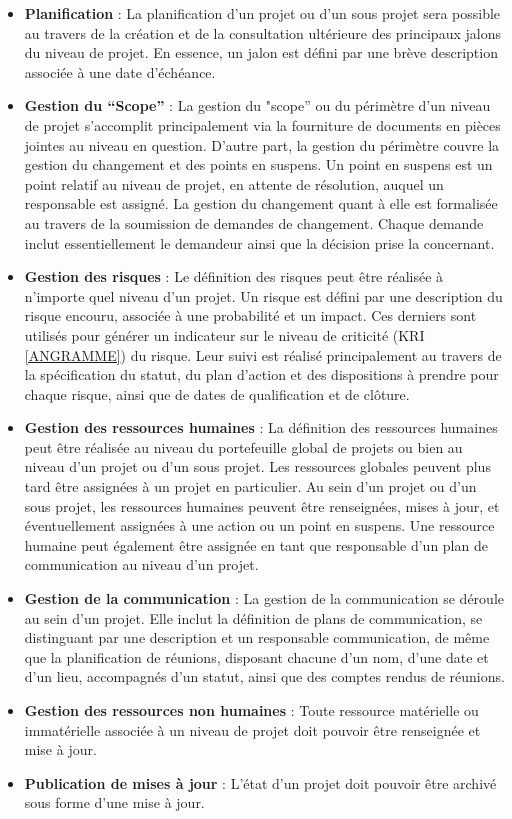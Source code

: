 \begin{spacing}{1.5}
\begin{itemize}
    \item \textbf{Planification} : La planification d'un projet ou d'un sous projet sera possible au travers de la création et de la consultation ultérieure des principaux jalons du niveau de projet. En essence, un jalon est défini par une brève description associée à une date d'échéance.
    \item \textbf{Gestion du “Scope”} : La gestion du "scope” ou du périmètre d'un niveau de projet s'accomplit principalement via la fourniture de documents en pièces jointes au niveau en question. D'autre part, la gestion du périmètre couvre la gestion du changement et des points en suspens. Un point en suspens est un point relatif au niveau de projet, en attente de résolution, auquel un responsable est assigné. La gestion du changement quant à elle est formalisée au travers de la soumission de demandes de changement. Chaque demande inclut essentiellement le demandeur ainsi que la décision prise la concernant.
    \item \textbf{Gestion des risques} : Le définition des risques peut être réalisée à n'importe quel niveau d'un projet. Un risque est défini par une description du risque encouru, associée à une probabilité et un impact. Ces derniers sont utilisés pour générer un indicateur sur le niveau de criticité (KRI \ref{ANGRAMME}) du risque. Leur suivi est réalisé principalement au travers de la spécification du statut, du plan d'action et des dispositions à prendre pour chaque risque, ainsi que de dates de qualification et de clôture.
    \item \textbf{Gestion des ressources humaines} : La définition des ressources humaines peut être réalisée au niveau du portefeuille global de projets ou bien au niveau d'un projet ou d'un sous projet. Les ressources globales peuvent plus tard être assignées à un projet en particulier. Au sein d'un projet ou d'un sous projet, les ressources humaines peuvent être renseignées, mises à jour, et éventuellement assignées à une action ou un point en suspens. Une ressource humaine peut également être assignée en tant que responsable d'un plan de communication au niveau d'un projet.
    \item \textbf{Gestion de la communication} : La gestion de la communication se déroule au sein d'un projet. Elle inclut la définition de plans de communication, se distinguant par une description et un responsable communication, de même que la planification de réunions, disposant chacune d'un nom, d'une date et d'un lieu, accompagnés d'un statut, ainsi que des comptes rendus de réunions.
    \item \textbf{Gestion des ressources non humaines} : Toute ressource matérielle ou immatérielle associée à un niveau de projet doit pouvoir être renseignée et mise à jour.
    \item \textbf{Publication de mises à jour} : L'état d'un projet doit pouvoir être archivé sous forme d'une mise à jour.
\end{itemize}
\


\end{spacing}
